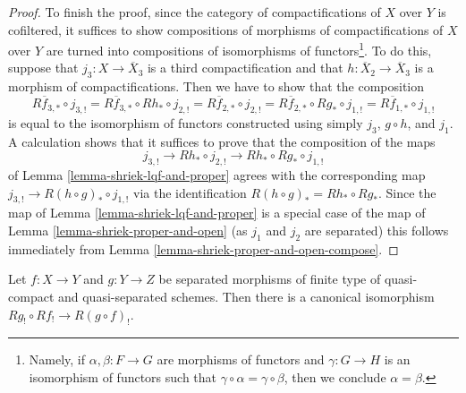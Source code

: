 \begin{proof}
\medskip\noindent
To finish the proof, since the category of compactifications of $X$ over $Y$
is cofiltered, it suffices to show compositions of morphisms of
compactifications of $X$ over $Y$ are turned into compositions of
isomorphisms of functors\footnote{Namely, if $\alpha, \beta : F \to G$
are morphisms of functors and $\gamma : G \to H$ is an isomorphism
of functors such that $\gamma \circ \alpha = \gamma \circ \beta$, then
we conclude $\alpha = \beta$.}. To do this, suppose that
$j_3 : X \to \overline{X}_3$
is a third compactification and that $h : \overline{X}_2 \to \overline{X}_3$
is a morphism of compactifications. Then we have to show that the
composition
$$
R\overline{f}_{3, *} \circ j_{3, !} =
R\overline{f}_{3, *} \circ Rh_* \circ j_{2, !} =
R\overline{f}_{2, *} \circ j_{2, !} =
R\overline{f}_{2, *} \circ Rg_* \circ j_{1, !} =
R\overline{f}_{1, *} \circ j_{1, !}
$$
is equal to the isomorphism of functors constructed using simply
$j_3$, $g \circ h$, and $j_1$. A calculation shows that it suffices to
prove that the composition of the maps
$$
j_{3, !} \to Rh_* \circ j_{2, !} \to Rh_* \circ Rg_* \circ j_{1, !}
$$
of Lemma \ref{lemma-shriek-lqf-and-proper} agrees with the corresponding
map $j_{3, !} \to R(h \circ g)_* \circ j_{1, !}$
via the identification $R(h \circ g)_* = Rh_* \circ Rg_*$.
Since the map of Lemma \ref{lemma-shriek-lqf-and-proper}
is a special case of the map of Lemma \ref{lemma-shriek-proper-and-open}
(as $j_1$ and $j_2$ are separated) this follows immediately from
Lemma \ref{lemma-shriek-proper-and-open-compose}.
\end{proof}

\begin{lemma}
\label{lemma-shriek-composition}
Let $f : X \to Y$ and $g : Y \to Z$ be separated morphisms of finite type
of quasi-compact and quasi-separated schemes. Then there is a canonical
isomorphism $Rg_! \circ Rf_! \to R(g \circ f)_!$.
\end{lemma}

